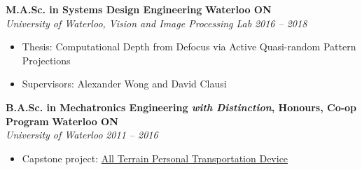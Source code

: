     \textbf{M.A.Sc. in Systems Design Engineering}
    \hfill
    \textbf{Waterloo ON}\\
    \textit{University of Waterloo, Vision and Image Processing Lab}
    \hfill
    \textit{2016 -- 2018}
    \begin{itemize}
        \item Thesis: Computational Depth from Defocus via Active Quasi-random Pattern Projections
        \item Supervisors: Alexander Wong and David Clausi
    \end{itemize}
    \vspace{\interlist}

    \textbf{B.A.Sc. in Mechatronics Engineering \emph{with Distinction}, Honours, Co-op Program }
    \hfill
    \textbf{Waterloo ON}\\
    \textit{University of Waterloo}
    \hfill
    \textit{2011 -- 2016}
    \begin{itemize}
        \item Capstone project: \href{https://youtu.be/OwfrKlr_Zhk}{All Terrain Personal Transportation Device}
    \end{itemize}
